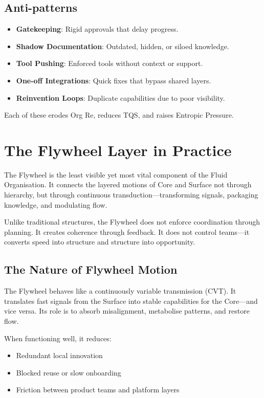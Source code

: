 \documentclass[12pt]{article}
\begin{document}
\subsection*{Anti-patterns}
\begin{itemize}
    \item \textbf{Gatekeeping}: Rigid approvals that delay progress.
    \item \textbf{Shadow Documentation}: Outdated, hidden, or siloed knowledge.
    \item \textbf{Tool Pushing}: Enforced tools without context or support.
    \item \textbf{One-off Integrations}: Quick fixes that bypass shared layers.
    \item \textbf{Reinvention Loops}: Duplicate capabilities due to poor visibility.
\end{itemize}

Each of these erodes Org Re, reduces TQS, and raises Entropic Pressure.

\section{The Flywheel Layer in Practice}

The Flywheel is the least visible yet most vital component of the Fluid Organisation. It connects the layered motions of Core and Surface not through hierarchy, but through continuous transduction---transforming signals, packaging knowledge, and modulating flow.

Unlike traditional structures, the Flywheel does not enforce coordination through planning. It creates coherence through feedback. It does not control teams---it converts speed into structure and structure into opportunity.

\subsection*{The Nature of Flywheel Motion}

The Flywheel behaves like a continuously variable transmission (CVT). It translates fast signals from the Surface into stable capabilities for the Core---and vice versa. Its role is to absorb misalignment, metabolise patterns, and restore flow.

When functioning well, it reduces:
\begin{itemize}
    \item Redundant local innovation
    \item Blocked reuse or slow onboarding
    \item Friction between product teams and platform layers
\end{itemize}
\end{document}
